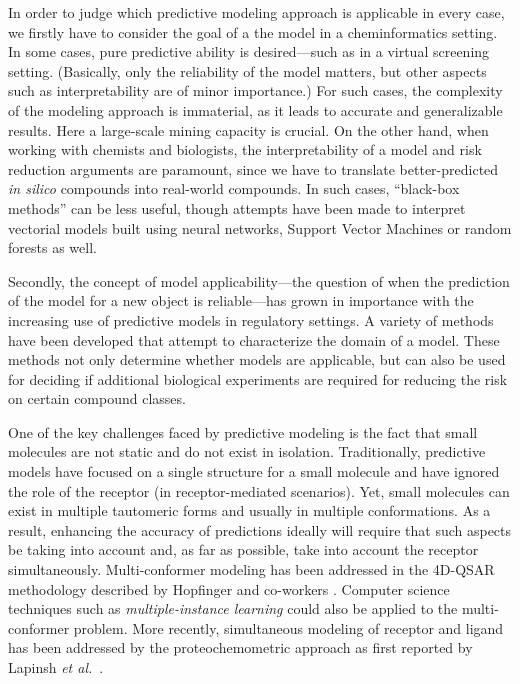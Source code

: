 \documentclass{sig-alternate}
\begin{document}
In order to judge which predictive modeling approach is applicable in every case, we firstly have to consider the goal
of a the model in a cheminformatics setting. In some cases, pure predictive ability is
desired---such as in a virtual screening setting. (Basically, only the reliability of the model matters, but other
aspects such as interpretability are of minor importance.) For such cases, the
complexity of the modeling approach is immaterial, as it leads to
accurate and generalizable results. Here a large-scale mining capacity
is crucial. On the other hand, when working with chemists and
biologists, the interpretability of a model and risk reduction
arguments are paramount, since we have to translate better-predicted
\emph{in silico} compounds into real-world compounds. In such cases,
``black-box methods'' can be less useful, though attempts have been made
to interpret vectorial models built using neural networks, Support Vector Machines or
random forests as well.

Secondly, the concept of model applicability---the question of when the prediction of the model
for a new object is reliable---has grown in importance with
the increasing use of predictive models in regulatory settings. A
variety of methods have been developed that attempt to characterize
the domain of a model. These methods not only determine whether models
are applicable, but can also be used for deciding if additional
biological experiments are required for reducing the risk on certain
compound classes.

One of the key challenges faced by predictive modeling is the fact
that small molecules are not static and do not exist in
isolation. Traditionally, predictive models have focused on a single
structure for a small molecule and have ignored the role of the
receptor (in receptor-mediated scenarios). Yet, small molecules can
exist in multiple tautomeric forms and usually in multiple
conformations. As a result, enhancing the accuracy of predictions
ideally will require that such aspects be taking into account and, as
far as possible, take into account the receptor
simultaneously. Multi-conformer modeling has been addressed in the
4D-QSAR methodology described by Hopfinger and co-workers
\cite{Albuquerque:1998ys}.  Computer science techniques such as
\emph{multiple-instance learning} could also be applied to the
multi-conformer problem. More recently, simultaneous modeling of
receptor and ligand has been addressed by the proteochemometric
approach as first reported by Lapinsh \textit{et
  al.}~\cite{lapinsh2001}.
\end{document}
